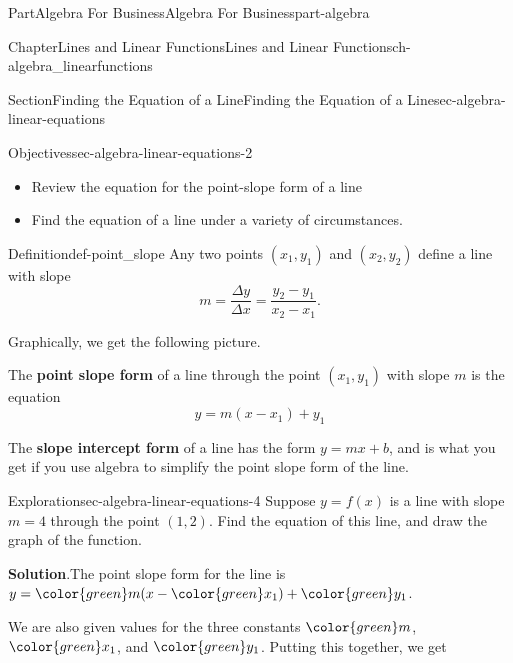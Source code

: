 \documentclass{tufte-book}
\newcommand{\blocktitlefont}{\relax}
\newcommand{\terminology}[1]{\textbf{#1}}
\numberwithin{equation}{chapter}
\begin{document}
\begin{partptx}{Part}{Algebra For Business}{}{Algebra For Business}{}{}{part-algebra}
\begin{chapterptx}{Chapter}{Lines and Linear Functions}{}{Lines and Linear Functions}{}{}{ch-algebra_linearfunctions}
\begin{sectionptx}{Section}{Finding the Equation of a Line}{}{Finding the Equation of a Line}{}{}{sec-algebra-linear-equations}
\begin{objectives}{Objectives}{sec-algebra-linear-equations-2}
%
\begin{itemize}[label=\textbullet]
\item{}Review the equation for the point-slope form of a line%
\item{}Find the equation of a line under a variety of circumstances.%
\end{itemize}
\end{objectives}
\begin{definition}{Definition}{}{def-point_slope}%
Any two points \((x_1,y_1)\) and \((x_2,y_2)\) define a line with slope%
\begin{equation*}
m = \dfrac{\Delta y}{\Delta x} = \dfrac{y_2-y_1}{x_2-x_1}\text{.}
\end{equation*}
%
\par
Graphically, we get the following picture.%
\begin{image}{0.3}{0.4}{0.3}{}%
%
\end{image}%
The \terminology{point slope form} of a line through the point \((x_1,y_1)\) with slope \(m\) is the equation%
\begin{equation*}
y = m (x - x_1) + y_1
\end{equation*}
%
\par
The \terminology{slope intercept form} of a line has the form \(y = m x + b\), and is what you get if you use algebra to simplify the point slope form of the line.%
\end{definition}
\begin{exploration}{Exploration}{}{sec-algebra-linear-equations-4}%
Suppose \(y = f(x)\) is a line with slope \(m=4\) through the point \((1,2)\).  Find the equation of this line, and draw the graph of the function.%
\par\smallskip%
\noindent\textbf{\blocktitlefont Solution}.\hypertarget{sec-algebra-linear-equations-4-2}{}\quad{}The point slope form for the line is \(y = {\color{green} m} (x - { \color{green} x_1}) + {\color{green} y_1}\).%
\par
We are also given values for the three constants \(\color{green} m\), \(\color{green} x_1\), and \(\color{green} y_1\). Putting this together, we get%

\end{exploration}
\end{sectionptx}
\end{chapterptx}
\end{partptx}
\end{document}

